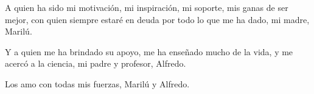 \thispagestyle{empty}
\vspace{8cm}

\begin{dedication}
A quien ha sido mi motivación, mi inspiración, mi soporte, mis ganas de ser mejor, con quien siempre estaré en deuda por todo lo que me ha dado, mi madre, Marilú.\\
\vspace{1cm}

Y a quien me ha brindado su apoyo, me ha enseñado mucho de la vida, y me acercó a la ciencia, mi padre y profesor, Alfredo.\\
\vspace{1cm}

Los amo con todas mis fuerzas, Marilú y Alfredo.\\
\end{dedication}


